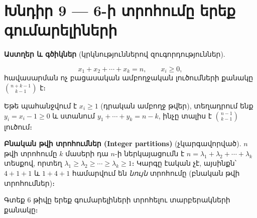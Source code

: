 \documentclass[12pt, a4paper]{article}
\begin{document}
\newpage
\section{Խնդիր 9 — 6-ի տրոհումը երեք գումարելիների}

\begin{theorybox}
\textbf{Աստղեր և գծիկներ} (կրկնություններով զուգորդություններ).\;

\begin{center}
\end{center}

\[
  x_1 + x_2 + \cdots + x_k = n, \qquad x_i \ge 0,
\]
հավասարման ոչ բացասական ամբողջական լուծումների քանակը
$\displaystyle\binom{n+k-1}{k-1}$ է։

\medskip
Եթե պահանջվում է $x_i \ge 1$ (դրական ամբողջ թվեր), տեղադրում ենք $y_i = x_i - 1 \ge 0$
և ստանում $y_1 + \cdots + y_k = n - k$, ինչը տալիս է
$\displaystyle\binom{n-1}{k-1}$ լուծում։

\medskip
\textbf{Բնական թվի տրոհումներ (Integer partitions)} (չկարգավորված).\;
$n$ թվի տրոհումը $k$ մասերի դա $n$-ի ներկայացումն է
$n = \lambda_1 + \lambda_2 + \cdots + \lambda_k$ տեսքով, որտեղ
$\lambda_1 \ge \lambda_2 \ge \cdots \ge \lambda_k \ge 1$։
Կարգը էական չէ, այսինքն՝ $4+1+1$ և $1+4+1$ համարվում են \emph{նույն} տրոհումը (բնական թվի տրոհումներ)։

\begin{center}
\end{center}
\end{theorybox}

\begin{problembox}
Գտեք 6 թիվը երեք գումարելիների տրոհելու տարբերակների քանակը։
\end{problembox}
\end{document}
